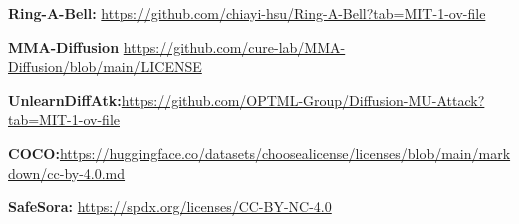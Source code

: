 \noindent\textbf{Ring-A-Bell:} \href{https://github.com/chiayi-hsu/Ring-A-Bell?tab=MIT-1-ov-file#readme}{https://github.com/chiayi-hsu/Ring-A-Bell?tab=MIT-1-ov-file}

\noindent\textbf{MMA-Diffusion} \href{https://github.com/cure-lab/MMA-Diffusion/blob/main/LICENSE}{https://github.com/cure-lab/MMA-Diffusion/blob/main/LICENSE}

\noindent\textbf{UnlearnDiffAtk:}\href{https://github.com/OPTML-Group/Diffusion-MU-Attack?tab=MIT-1-ov-file#readme}{https://github.com/OPTML-Group/Diffusion-MU-Attack?tab=MIT-1-ov-file}

\noindent\textbf{COCO:}\href{https://huggingface.co/datasets/choosealicense/licenses/blob/main/markdown/cc-by-4.0.md}{https://huggingface.co/datasets/choosealicense/licenses/blob/main/markdown/cc-by-4.0.md}

\noindent\textbf{SafeSora:} \href{https://spdx.org/licenses/CC-BY-NC-4.0}{https://spdx.org/licenses/CC-BY-NC-4.0}


















